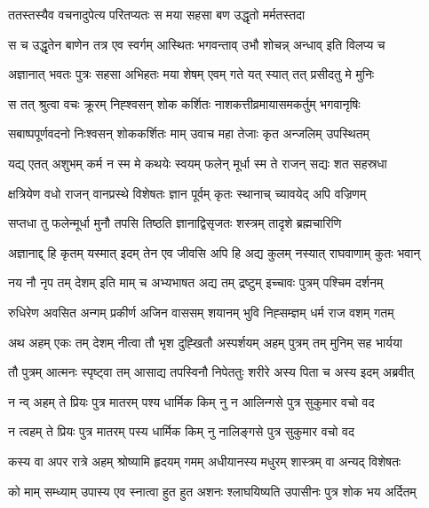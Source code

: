 \twolineshloka
{ततस्तस्यैव वचनादुपेत्य परितप्यतः}
{स मया सहसा बण उद्धृतो मर्मतस्तदा} %

\twolineshloka
{स च उद्धृतेन बाणेन तत्र एव स्वर्गम् आस्थितः}
{भगवन्ताव् उभौ शोचन्न् अन्धाव् इति विलप्य च} %

\twolineshloka
{अज्ञानात् भवतः पुत्रः सहसा अभिहतः मया}
{शेषम् एवम् गते यत् स्यात् तत् प्रसीदतु मे मुनिः} %

\twolineshloka
{स तत् श्रुत्वा वचः क्रूरम् निह्श्वसन् शोक कर्शितः}
{नाशकत्तीव्रमायासमकर्तुम् भगवानृषिः} %

\twolineshloka
{सबाष्पपूर्णवदनो निःश्वसन् शोककर्शितः}
{माम् उवाच महा तेजाः कृत अन्जलिम् उपस्थितम्} %

\twolineshloka
{यद्य् एतत् अशुभम् कर्म न स्म मे कथयेः स्वयम्}
{फलेन् मूर्धा स्म ते राजन् सद्यः शत सहस्रधा} %

\twolineshloka
{क्षत्रियेण वधो राजन् वानप्रस्थे विशेषतः}
{ज्ञान पूर्वम् कृतः स्थानाच् च्यावयेद् अपि वज्रिणम्} %

\twolineshloka
{सप्तधा तु फलेन्मूर्धा मुनौ तपसि तिष्ठति}
{ज्ञानाद्विसृजतः शस्त्रम् तादृशे ब्रह्मचारिणि} %

\twolineshloka
{अज्ञानाद्द् हि कृतम् यस्मात् इदम् तेन एव जीवसि}
{अपि हि अद्य कुलम् नस्यात् राघवाणाम् कुतः भवान्} %

\twolineshloka
{नय नौ नृप तम् देशम् इति माम् च अभ्यभाषत}
{अद्य तम् द्रष्टुम् इच्चावः पुत्रम् पश्चिम दर्शनम्} %

\twolineshloka
{रुधिरेण अवसित अन्गम् प्रकीर्ण अजिन वाससम्}
{शयानम् भुवि निह्सम्ज्ञम् धर्म राज वशम् गतम्} %

\twolineshloka
{अथ अहम् एकः तम् देशम् नीत्वा तौ भृश दुह्खितौ}
{अस्पर्शयम् अहम् पुत्रम् तम् मुनिम् सह भार्यया} %

\twolineshloka
{तौ पुत्रम् आत्मनः स्पृष्ट्वा तम् आसाद्य तपस्विनौ}
{निपेततुः शरीरे अस्य पिता च अस्य इदम् अब्रवीत्} %

\twolineshloka
{न न्व् अहम् ते प्रियः पुत्र मातरम् पश्य धार्मिक}
{किम् नु न आलिन्गसे पुत्र सुकुमार वचो वद} %

\twolineshloka
{न त्वहम् ते प्रियः पुत्र मातरम् पस्य धार्मिक}
{किम् नु नालिङ्गसे पुत्र सुकुमार वचो वद} %

\twolineshloka
{कस्य वा अपर रात्रे अहम् श्रोष्यामि हृदयम् गमम्}
{अधीयानस्य मधुरम् शास्त्रम् वा अन्यद् विशेषतः} %

\twolineshloka
{को माम् सम्ध्याम् उपास्य एव स्नात्वा हुत हुत अशनः}
{श्लाघयिष्यति उपासीनः पुत्र शोक भय अर्दितम्} %

